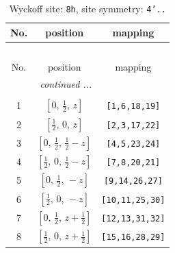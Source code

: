 \documentclass[fleqn,8pt]{jsarticle}
\begin{document}
\begin{longtable}{ccc}
\caption{Wyckoff site: {\tt 8h}, site symmetry: {\tt 4'..}}
 \\
 \hline \hline
No. & position & mapping \\ \hline \endfirsthead

\multicolumn{2}{l}{\tablename\ \thetable{}} \\
 \hline \hline
No. & position & mapping \\ \hline \endhead

 \hline \hline
\multicolumn{2}{r}{\footnotesize\it continued ...} \\ \endfoot

 \hline \hline
\multicolumn{2}{r}{} \\ \endlastfoot

1 & $\left[ 0,\, \frac{1}{2},\, z \right]$ & {\tt [1,6,18,19]} \\ \hline
2 & $\left[ \frac{1}{2},\, 0,\, z \right]$ & {\tt [2,3,17,22]} \\ \hline
3 & $\left[ 0,\, \frac{1}{2},\, \frac{1}{2} - z \right]$ & {\tt [4,5,23,24]} \\ \hline
4 & $\left[ \frac{1}{2},\, 0,\, \frac{1}{2} - z \right]$ & {\tt [7,8,20,21]} \\ \hline
5 & $\left[ 0,\, \frac{1}{2},\, - z \right]$ & {\tt [9,14,26,27]} \\ \hline
6 & $\left[ \frac{1}{2},\, 0,\, - z \right]$ & {\tt [10,11,25,30]} \\ \hline
7 & $\left[ 0,\, \frac{1}{2},\, z + \frac{1}{2} \right]$ & {\tt [12,13,31,32]} \\ \hline
8 & $\left[ \frac{1}{2},\, 0,\, z + \frac{1}{2} \right]$ & {\tt [15,16,28,29]} \\
\end{longtable}
\renewcommand{\arraystretch}{1.2}
\end{document}
